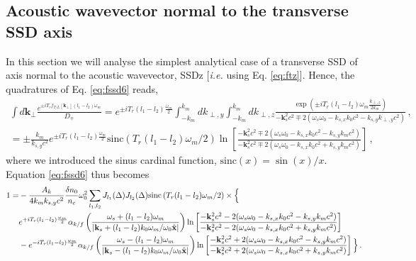 \documentclass[
 reprint,
 amsmath,amssymb,
 aps,
]{revtex4-1}
\begin{document}
\begin{widetext}
\subsection{Acoustic wavevector normal to the transverse SSD axis}\label{sec:ssdtz}
In this section we will analyse the simplest analytical case of a transverse SSD of axis normal to the acoustic wavevector, SSDz [\emph{i.e.} using Eq. \eqref{eq:ftz}]. 
Hence, the  quadratures of Eq. \eqref{eq:fssd6} reads, 
\begin{align}
 \int d\mathbf{k}_\perp 
     \frac{  e^{ \pm  iT_{r}f_{T/L}[\mathbf{k}_\perp]  (l_1-l_2) \omega_m }
     }{D_\mp}=  e^{\pm iT_{r} (l_1-l_2)\frac{ \omega_m}{2} }
      \int_{-k_m}^{k_m} dk_{\perp,y} \int_{-k_m}^{k_m} dk_{\perp,z}\frac{  \exp\left( \pm  iT_{r}  (l_1-l_2)\omega_m \frac{k_{\perp,z}}{2k_m}  \right)
     }{- \mathbf{k}_s^2c^2 \mp 2(\omega_s\omega_{0} - k_{s,x}   k_0 c^2 - k_{s,y} k_{\perp,y} c^2) }
   \, ,\label{eq:int1}  \nonumber \\
   =  \pm \frac{ k_m}{k_{s,y} c^2} e^{ \pm iT_{r} (l_1-l_2)\frac{ \omega_m}{2} }
      \mathrm{sinc}\left(  T_{r}  (l_1-l_2) \omega_m/2  \right)
    \ln\left[\frac{- \mathbf{k}_s^2c^2\mp 2(\omega_s\omega_{0} - k_{s,x}   k_0 c^2  - k_{s,y} k_m c^2)}
    {- \mathbf{k}_s^2c^2\mp 2(\omega_s\omega_{0} - k_{s,x}   k_0  c^2 + k_{s,y} k_m c^2)}\right]\, ,
\end{align}
where we introduced the sinus cardinal function, $ \mathrm{sinc}(x)=\sin(x)/x$.
Equation \eqref{eq:fssd6} thus becomes
 \begin{align}
   1 =& -\frac{A_k}{4k_mk_{s,y} c^2} \frac{\delta n_0}{n_c}\omega_0^2
    \sum_{l_1, l_2} 
     J_{l_1}(\Delta)J_{l_2}(\Delta)
      \mathrm{sinc}\left(  T_{r}  (l_1-l_2) \omega_m/2  \right)\times \Big\{
      \nonumber \\&
      e^{ + iT_{r} (l_1-l_2)\frac{ \omega_m}{2} }
  \alpha_{k/f}\left(\frac{\omega_s+(l_1-l_2)\omega_m}
  {\vert\mathbf{k}_s+(l_1-l_2)k_0\omega_m/\omega_0\Hat{\mathbf{x}} \vert}
  \right)   
  \ln\left[\frac{- \mathbf{k}_s^2c^2-2(\omega_s\omega_{0} - k_{s,x}   k_0 c^2  - k_{s,y} k_m c^2)}
    {- \mathbf{k}_s^2c^2 -2(\omega_s\omega_{0} - k_{s,x}   k_0 c^2  + k_{s,y} k_m c^2)}\right]
     \nonumber \\&
      -e^{ - iT_{r} (l_1-l_2)\frac{ \omega_m}{2} }
  \alpha_{k/f}\left(\frac{\omega_s-(l_1-l_2)\omega_m}
  {\vert\mathbf{k}_s-(l_1-l_2)k_0\omega_m/\omega_0\Hat{\mathbf{x}} \vert}
  \right)   
  \ln\left[\frac{- \mathbf{k}_s^2c^2+2(\omega_s\omega_{0} - k_{s,x}   k_0 c^2  - k_{s,y} k_m c^2)}
    {- \mathbf{k}_s^2c^2 +2(\omega_s\omega_{0} - k_{s,x}   k_0 c^2  + k_{s,y} k_m c^2)}\right]
    \Big\}
   \, .\label{eq:fssd7}
   \end{align}


\end{widetext}
\end{document}
